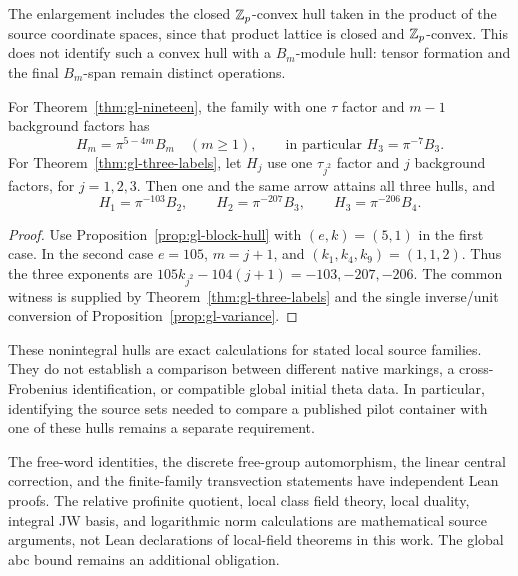 The enlargement includes the closed $\mathbb Z_p$-convex hull taken in
the product of the source coordinate spaces, since that product
lattice is closed and $\mathbb Z_p$-convex. This does not identify such
a convex hull with a $B_m$-module hull: tensor formation and the
final $B_m$-span remain distinct operations.

\begin{corollary}
\label{cor:gl-exact-hulls}
For Theorem~\ref{thm:gl-nineteen}, the family with one $\tau$
factor and $m-1$ background factors has
\[
 H_m=\pi^{5-4m}B_m\quad(m\ge1),
 \qquad\text{in particular }H_3=\pi^{-7}B_3.
\]
For Theorem~\ref{thm:gl-three-labels}, let $H_j$ use one
$\tau_{j^2}$ factor and $j$ background factors, for $j=1,2,3$.
Then one and the same arrow attains all three hulls, and
\begin{equation}\label{eq:gl-three-hulls}
 H_1=\pi^{-103}B_2,\qquad
 H_2=\pi^{-207}B_3,\qquad
 H_3=\pi^{-206}B_4.
\end{equation}
\end{corollary}
\begin{proof}
Use Proposition~\ref{prop:gl-block-hull} with $(e,k)=(5,1)$
in the first case. In the second case $e=105$, $m=j+1$, and
$(k_1,k_4,k_9)=(1,1,2)$. Thus the three exponents are
$105k_{j^2}-104(j+1)=-103,-207,-206$.
The common witness is supplied by Theorem~\ref{thm:gl-three-labels}
and the single inverse/unit conversion of
Proposition~\ref{prop:gl-variance}.
\end{proof}

These nonintegral hulls are exact calculations for stated local
source families. They do not establish a comparison between different
native markings, a cross-Frobenius identification, or compatible
global initial theta data. In particular, identifying the source
sets needed to compare a published pilot container with one of these
hulls remains a separate requirement.

The free-word identities, the discrete free-group automorphism,
the linear central correction, and the finite-family transvection
statements have independent Lean proofs. The relative profinite
quotient, local class field theory, local duality, integral JW basis,
and logarithmic norm calculations are mathematical source arguments,
not Lean declarations of local-field theorems in this work. The
global abc bound remains an additional obligation.
